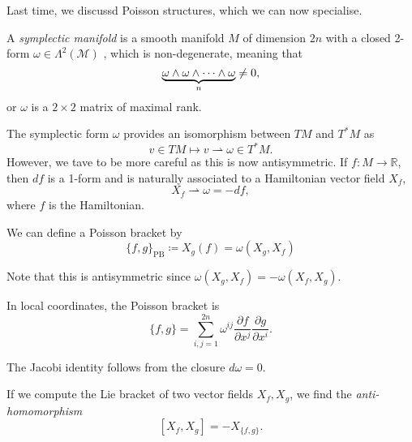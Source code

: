 
Last time, we discussd Poisson structures, which we can now specialise.

\begin{definition}
  A \emph{symplectic manifold} is a smooth manifold $M$  of dimension $2n$  with a closed 2-form $\omega \in \Lambda^{2}(\mathcal{M})$ , which is non-degenerate, meaning that
  \begin{equation}
    \underbrace{\omega \wedge \omega \wedge \dots \wedge \omega}_{\mathclap{n}} \neq 0,
  \end{equation}
  or $\omega$ is a $2 \times 2$ matrix of maximal rank.
\end{definition}

The symplectic form $\omega$ provides an isomorphism between $TM$ and $T^*M$ as
\begin{equation}
  v \in TM \mapsto v \rightharpoonup \omega \in T^*M.
\end{equation}
However, we tave to be more careful as this is now antisymmetric.
If $f \colon M \to \mathbb{R}$, then $df$ is a 1-form and is naturally associated to a Hamiltonian vector field $X_f$,
\begin{equation}
  X_f \rightharpoonup \omega = -d f,
\end{equation}
where $f$ is the Hamiltonian.

\begin{claim}
  We can define a Poisson bracket by
  \begin{equation}
    \{ f, g \}_{\text{PB}} \coloneqq X_g(f) = \omega(X_g, X_f)
  \end{equation}
\end{claim}
\begin{remark}
  Note that this is antisymmetric since $\omega(X_g, X_f) = - \omega(X_f, X_g)$.
\end{remark}

In local coordinates, the Poisson bracket is
\begin{equation}
  \{f, g\} = \sum_{i, j = 1}^{2n} \omega^{ij} \frac{\partial f}{\partial x^{j}} \frac{\partial g}{\partial x^{i}}.
\end{equation}
\begin{exercise}
  The Jacobi identity follows from the closure $d\omega = 0$.
\end{exercise}

If we compute the Lie bracket of two vector fields $X_f, X_g$, we find the \emph{anti-homomorphism}
\begin{equation}
  \label{eq:anti-homomorphism}
  [X_f, X_g] = - X_{\{f, g\}}.
\end{equation}

